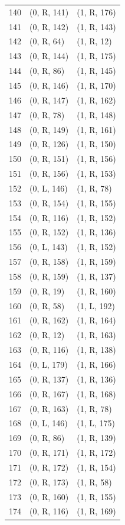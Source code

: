 \begin{longtable}{rll}
140 & (0, R, 141) & (1, R, 176) \\
141 & (0, R, 142) & (1, R, 143) \\
142 & (0, R, 64) & (1, R, 12) \\
143 & (0, R, 144) & (1, R, 175) \\
144 & (0, R, 86) & (1, R, 145) \\
145 & (0, R, 146) & (1, R, 170) \\
146 & (0, R, 147) & (1, R, 162) \\
147 & (0, R, 78) & (1, R, 148) \\
148 & (0, R, 149) & (1, R, 161) \\
149 & (0, R, 126) & (1, R, 150) \\
150 & (0, R, 151) & (1, R, 156) \\
151 & (0, R, 156) & (1, R, 153) \\
152 & (0, L, 146) & (1, R, 78) \\
153 & (0, R, 154) & (1, R, 155) \\
154 & (0, R, 116) & (1, R, 152) \\
155 & (0, R, 152) & (1, R, 136) \\
156 & (0, L, 143) & (1, R, 152) \\
157 & (0, R, 158) & (1, R, 159) \\
158 & (0, R, 159) & (1, R, 137) \\
159 & (0, R, 19) & (1, R, 160) \\
160 & (0, R, 58) & (1, L, 192) \\
161 & (0, R, 162) & (1, R, 164) \\
162 & (0, R, 12) & (1, R, 163) \\
163 & (0, R, 116) & (1, R, 138) \\
164 & (0, L, 179) & (1, R, 166) \\
165 & (0, R, 137) & (1, R, 136) \\
166 & (0, R, 167) & (1, R, 168) \\
167 & (0, R, 163) & (1, R, 78) \\
168 & (0, L, 146) & (1, L, 175) \\
169 & (0, R, 86) & (1, R, 139) \\
170 & (0, R, 171) & (1, R, 172) \\
171 & (0, R, 172) & (1, R, 154) \\
172 & (0, R, 173) & (1, R, 58) \\
173 & (0, R, 160) & (1, R, 155) \\
174 & (0, R, 116) & (1, R, 169) \\

\end{longtable}
